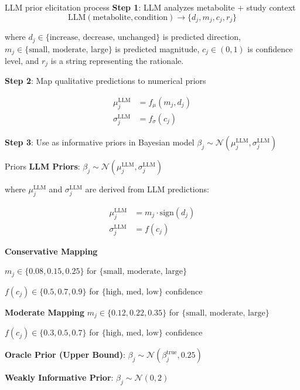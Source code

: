\documentclass[
  ignorenonframetext,
  aspectratio=169,
]{beamer}
\begin{document}
\begin{frame}{LLM prior elicitation process}
\label{llm-prior-elicitation-process}
\textbf{Step 1}: LLM analyzes metabolite + study context
\[\text{LLM}(\text{metabolite}, \text{condition}) \rightarrow \{d_j, m_j, c_j, r_j\}\]

where \(d_j \in \{\text{increase, decrease, unchanged}\}\) is predicted
direction, \(m_j \in \{\text{small, moderate, large}\}\) is predicted
magnitude, \(c_j \in \left(0, 1\right)\) is confidence level, and
\(r_j\) is a string representing the rationale.

\textbf{Step 2}: Map qualitative predictions to numerical priors

\begin{align*}
\mu_j^{\text{LLM}} &= f_{\mu}\left(m_j, d_j\right) \\
\sigma_j^{\text{LLM}} &= f_{\sigma}\left(c_j\right)
\end{align*}

\textbf{Step 3}: Use as informative priors in Bayesian model
\(\beta_j \sim \mathcal{N}(\mu_j^{\text{LLM}}, \sigma_j^{\text{LLM}})\)
\end{frame}

\begin{frame}{Priors}
\label{priors}
\textbf{LLM Priors}:
\(\beta_j \sim \mathcal{N}(\mu_j^{\text{LLM}}, \sigma_j^{\text{LLM}})\)

where \(\mu_j^{\text{LLM}}\) and \(\sigma_j^{\text{LLM}}\) are derived
from LLM predictions:

\begin{align}
\mu_j^{\text{LLM}} &= m_j \cdot \text{sign}(d_j) \\
\sigma_j^{\text{LLM}} &= f(c_j)
\end{align}

\textbf{Conservative Mapping}

\(m_j \in \{0.08, 0.15, 0.25\}\) for
\(\{\text{small, moderate, large}\}\)

\(f(c_j) \in \{0.5, 0.7, 0.9\}\) for \(\{\text{high, med, low}\}\)
confidence

\textbf{Moderate Mapping} \(m_j \in \{0.12, 0.22, 0.35\}\) for
\(\{\text{small, moderate, large}\}\)

\(f(c_j) \in \{0.3, 0.5, 0.7\}\) for \(\{\text{high, med, low}\}\)
confidence

\textbf{Oracle Prior (Upper Bound)}:
\(\beta_j \sim \mathcal{N}(\beta_j^{\text{true}}, 0.25)\)

\textbf{Weakly Informative Prior}: \(\beta_j \sim \mathcal{N}(0, 2)\)
\end{frame}
\end{document}
